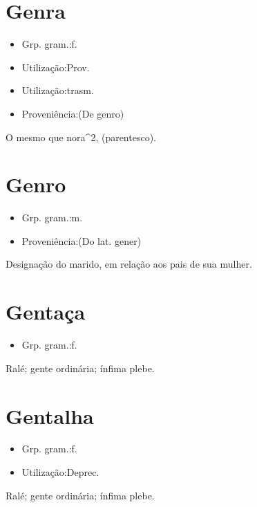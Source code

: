 \section{Genra}
\begin{itemize}
\item {Grp. gram.:f.}
\end{itemize}
\begin{itemize}
\item {Utilização:Prov.}
\end{itemize}
\begin{itemize}
\item {Utilização:trasm.}
\end{itemize}
\begin{itemize}
\item {Proveniência:(De \textunderscore genro\textunderscore )}
\end{itemize}
O mesmo que \textunderscore nora\textunderscore ^2, (parentesco).
\section{Genro}
\begin{itemize}
\item {Grp. gram.:m.}
\end{itemize}
\begin{itemize}
\item {Proveniência:(Do lat. \textunderscore gener\textunderscore )}
\end{itemize}
Designação do marido, em relação aos pais de sua mulher.
\section{Gentaça}
\begin{itemize}
\item {Grp. gram.:f.}
\end{itemize}
Ralé; gente ordinária; ínfima plebe.
\section{Gentalha}
\begin{itemize}
\item {Grp. gram.:f.}
\end{itemize}
\begin{itemize}
\item {Utilização:Deprec.}
\end{itemize}
Ralé; gente ordinária; ínfima plebe.
